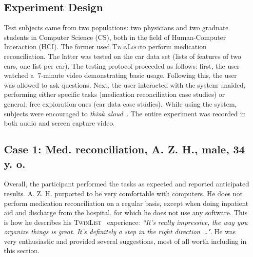 \documentclass{chi2009}
\newcommand{\TwinList}{\textsc{TwinList}}
\begin{document}
\subsection{Experiment Design}
Test subjects came from two populations: two physicians and two graduate students in Computer Science (CS), both in the field of Human-Computer Interaction (HCI). The former used \TwinList to perform medication reconciliation. The latter was tested on the car data set (lists of features of two cars, one list per car). The testing protocol proceeded as follows: first, the user watched a $~7$-minute video demonstrating basic usage. Following this, the user was allowed to ask questions. Next, the user interacted with the system unaided, performing either specific tasks (medication reconciliation case studies) or general, free exploration ones (car data case studies). While using the system, subjects were encouraged to \textit{think aloud}~\cite{lewis-1982}. The entire experiment was recorded in both audio and screen capture video. 

\subsection{Case 1: Med. reconciliation, A. Z. H., male, 34 y. o.}
Overall, the participant performed the tasks as expected and reported anticipated results. A. Z. H. purported to be very comfortable with computers. He does not perform medication reconciliation on a regular basis, except when doing inpatient aid and discharge from the hospital, for which he does not use any software. This is how he describes his \TwinList~ experience: \textit{``It's really impressive, the way you organize things is great. It's definitely a step in the right direction \dots"}. He was very enthusiastic and provided several suggestions, most of all worth including in this section. 
\end{document}
